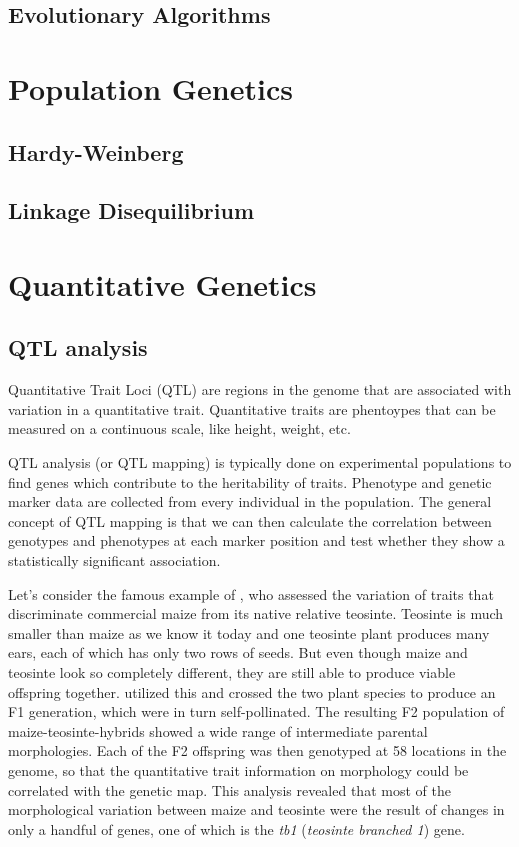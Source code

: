 \documentclass[12pt,]{book}
\begin{document}
\section{Evolutionary Algorithms}\label{evolutionary-algorithms}

\chapter{Population Genetics}\label{population-genetics}

\section{Hardy-Weinberg}\label{hardy-weinberg}

\section{Linkage Disequilibrium}\label{linkage-disequilibrium}

\chapter{Quantitative Genetics}\label{quantitative-genetics}

\section{QTL analysis}\label{qtl-analysis}

Quantitative Trait Loci (QTL) are regions in the genome that are
associated with variation in a quantitative trait. Quantitative traits
are phentoypes that can be measured on a continuous scale, like height,
weight, etc.

QTL analysis (or QTL mapping) is typically done on experimental
populations to find genes which contribute to the heritability of
traits. Phenotype and genetic marker data are collected from every
individual in the population. The general concept of QTL mapping is that
we can then calculate the correlation between genotypes and phenotypes
at each marker position and test whether they show a statistically
significant association.

Let's consider the famous example of \citet{Doebley285}, who assessed
the variation of traits that discriminate commercial maize from its
native relative teosinte. Teosinte is much smaller than maize as we know
it today and one teosinte plant produces many ears, each of which has
only two rows of seeds. But even though maize and teosinte look so
completely different, they are still able to produce viable offspring
together. \citet{Doebley285} utilized this and crossed the two plant
species to produce an F1 generation, which were in turn self-pollinated.
The resulting F2 population of maize-teosinte-hybrids showed a wide
range of intermediate parental morphologies. Each of the F2 offspring
was then genotyped at 58 locations in the genome, so that the
quantitative trait information on morphology could be correlated with
the genetic map. This analysis revealed that most of the morphological
variation between maize and teosinte were the result of changes in only
a handful of genes, one of which is the \emph{tb1} (\emph{teosinte
branched 1}) gene.
\end{document}
